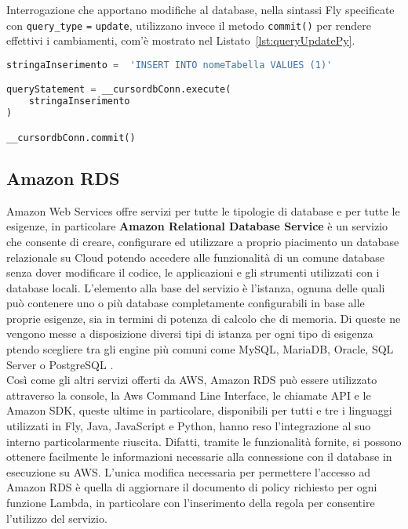 Interrogazione che apportano modifiche al database, nella sintassi Fly specificate con \verb|query_type| \verb|=| \verb|update|, utilizzano invece il metodo \verb|commit()| per rendere effettivi i cambiamenti, com'è mostrato nel Listato~\ref{lst:queryUpdatePy}.\\

\begin{lstlisting}[language=Python, caption={Codice Python generato per la variabile di tipo query per l'esecuzione di un'interrogazione di inserimento che utilizza una variabile di tipo stringa.}, label={lst:queryUpdatePy}]
stringaInserimento =  'INSERT INTO nomeTabella VALUES (1)'

queryStatement = __cursordbConn.execute(
    stringaInserimento
)

__cursordbConn.commit()
\end{lstlisting}

\subsection{Amazon RDS}
Amazon Web Services offre servizi per tutte le tipologie di database e per tutte le esigenze, in particolare \textbf{Amazon Relational Database Service} è un servizio che consente di creare, configurare ed utilizzare a proprio piacimento un database relazionale su Cloud potendo accedere alle funzionalità di un comune database senza dover modificare il codice, le applicazioni e gli strumenti utilizzati con i database locali. L'elemento alla base del servizio è l'istanza, ognuna delle quali può contenere uno o più database completamente configurabili in base alle proprie esigenze, sia in termini di potenza di calcolo che di memoria. Di queste ne vengono messe a disposizione diversi tipi di istanza per ogni tipo di esigenza ptendo scegliere tra gli engine più comuni come MySQL, MariaDB, Oracle, SQL Server o PostgreSQL \cite{RDS}. \\
Così come gli altri servizi offerti da AWS, Amazon RDS può essere utilizzato attraverso la console, la Aws Command Line Interface, le chiamate API e le Amazon SDK, queste ultime in particolare, disponibili per tutti e tre i linguaggi utilizzati in Fly, Java, JavaScript e Python, hanno reso l'integrazione al suo interno particolarmente riuscita. Difatti, tramite le funzionalità fornite, si possono ottenere facilmente le informazioni necessarie alla connessione con il database in esecuzione su AWS. L'unica modifica necessaria per permettere l'accesso ad Amazon RDS è quella di aggiornare il documento di policy richiesto per ogni funzione Lambda, in particolare con l'inserimento della regola per consentire l'utilizzo del servizio.

